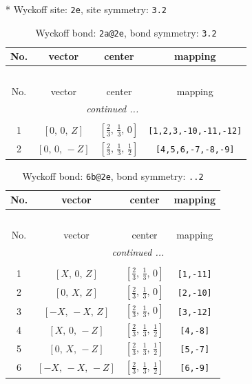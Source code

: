 \documentclass[fleqn,8pt]{jsarticle}
\begin{document}
* Wyckoff site: {\tt 2e}, site symmetry: {\tt 3.2}
\renewcommand{\arraystretch}{1.2}
\begin{longtable}{cccc}
\caption{Wyckoff bond: {\tt 2a@2e}, bond symmetry: {\tt 3.2}}
 \\
 \hline \hline
No. & vector & center & mapping \\ \hline \endfirsthead

\multicolumn{3}{l}{\tablename\ \thetable{}} \\
 \hline \hline
No. & vector & center & mapping \\ \hline \endhead

 \hline \hline
\multicolumn{3}{r}{\footnotesize\it continued ...} \\ \endfoot

 \hline \hline
\multicolumn{3}{r}{} \\ \endlastfoot

1 & $\left[ 0,\, 0,\, Z \right]$ & $\left[ \frac{2}{3},\, \frac{1}{3},\, 0 \right]$ & {\tt [1,2,3,-10,-11,-12]} \\ \hline
2 & $\left[ 0,\, 0,\, - Z \right]$ & $\left[ \frac{2}{3},\, \frac{1}{3},\, \frac{1}{2} \right]$ & {\tt [4,5,6,-7,-8,-9]} \\
\end{longtable}
\renewcommand{\arraystretch}{1.2}
\begin{longtable}{cccc}
\caption{Wyckoff bond: {\tt 6b@2e}, bond symmetry: {\tt ..2}}
 \\
 \hline \hline
No. & vector & center & mapping \\ \hline \endfirsthead

\multicolumn{3}{l}{\tablename\ \thetable{}} \\
 \hline \hline
No. & vector & center & mapping \\ \hline \endhead

 \hline \hline
\multicolumn{3}{r}{\footnotesize\it continued ...} \\ \endfoot

 \hline \hline
\multicolumn{3}{r}{} \\ \endlastfoot

1 & $\left[ X,\, 0,\, Z \right]$ & $\left[ \frac{2}{3},\, \frac{1}{3},\, 0 \right]$ & {\tt [1,-11]} \\ \hline
2 & $\left[ 0,\, X,\, Z \right]$ & $\left[ \frac{2}{3},\, \frac{1}{3},\, 0 \right]$ & {\tt [2,-10]} \\ \hline
3 & $\left[ - X,\, - X,\, Z \right]$ & $\left[ \frac{2}{3},\, \frac{1}{3},\, 0 \right]$ & {\tt [3,-12]} \\ \hline
4 & $\left[ X,\, 0,\, - Z \right]$ & $\left[ \frac{2}{3},\, \frac{1}{3},\, \frac{1}{2} \right]$ & {\tt [4,-8]} \\ \hline
5 & $\left[ 0,\, X,\, - Z \right]$ & $\left[ \frac{2}{3},\, \frac{1}{3},\, \frac{1}{2} \right]$ & {\tt [5,-7]} \\ \hline
6 & $\left[ - X,\, - X,\, - Z \right]$ & $\left[ \frac{2}{3},\, \frac{1}{3},\, \frac{1}{2} \right]$ & {\tt [6,-9]} \\
\end{longtable}
\end{document}

